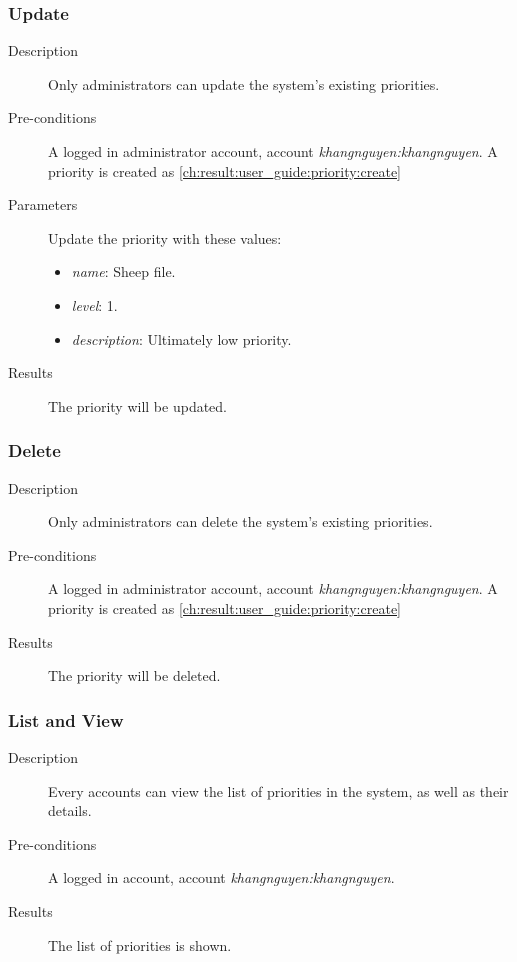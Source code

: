 \subsubsection{Update}
\label{ch:result:user_guide:priority:update}

\begin{description}
\item[Description] Only administrators can update the system's existing priorities.
\item[Pre-conditions] A logged in administrator account, \eg account \emph{khangnguyen:khangnguyen}.
A priority is created as \autoref{ch:result:user_guide:priority:create}
\item[Parameters] Update the priority with these values:
\begin{itemize}
\item \emph{name}: Sheep file.
\item \emph{level}: 1.
\item \emph{description}: Ultimately low priority.
\end{itemize}
\item[Results] The priority will be updated.
\end{description}

\subsubsection{Delete}
\label{ch:result:user_guide:priority:delete}

\begin{description}
\item[Description] Only administrators can delete the system's existing priorities.
\item[Pre-conditions] A logged in administrator account, \eg account \emph{khangnguyen:khangnguyen}.
A priority is created as \autoref{ch:result:user_guide:priority:create}
\item[Results] The priority will be deleted.
\end{description}

\subsubsection{List and View}
\label{ch:result:user_guide:priority:list}

\begin{description}
\item[Description] Every accounts can view the list of priorities in the system, as well as their details.
\item[Pre-conditions] A logged in account, \eg account \emph{khangnguyen:khangnguyen}.
\item[Results] The list of priorities is shown.
\end{description}

